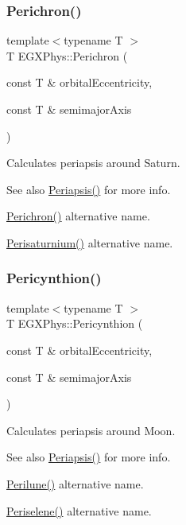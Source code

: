 \subsubsection{\texorpdfstring{Perichron()}{Perichron()}}
{\footnotesize\ttfamily template$<$typename T $>$ \\
T E\+G\+X\+Phys\+::\+Perichron (\begin{DoxyParamCaption}\item[{const T \&}]{orbital\+Eccentricity,  }\item[{const T \&}]{semimajor\+Axis }\end{DoxyParamCaption})}



Calculates periapsis around Saturn. 

\begin{DoxySeeAlso}{See also}
\hyperlink{group___astrophysics_ga4414ac75539371ec874a3d25cad6c9fe}{Periapsis()} for more info. 

\hyperlink{group___astrophysics_ga12b5e99aa2e3e7031ef6ce93060cf516}{Perichron()} alternative name. 

\hyperlink{group___astrophysics_ga60a50d09d29ebe47cbbfc125c2ea42bf}{Perisaturnium()} alternative name. 
\end{DoxySeeAlso}
\mbox{\label{group___astrophysics_gaeeba153b188cd06cbd233eaef12f0a6a}} 
\subsubsection{\texorpdfstring{Pericynthion()}{Pericynthion()}}
{\footnotesize\ttfamily template$<$typename T $>$ \\
T E\+G\+X\+Phys\+::\+Pericynthion (\begin{DoxyParamCaption}\item[{const T \&}]{orbital\+Eccentricity,  }\item[{const T \&}]{semimajor\+Axis }\end{DoxyParamCaption})}



Calculates periapsis around Moon. 

\begin{DoxySeeAlso}{See also}
\hyperlink{group___astrophysics_ga4414ac75539371ec874a3d25cad6c9fe}{Periapsis()} for more info. 

\hyperlink{group___astrophysics_ga2cc7ab05e18d32c94d8d74972e032793}{Perilune()} alternative name. 

\hyperlink{group___astrophysics_ga255874374dde571531e443cdbef9ef0c}{Periselene()} alternative name. 
\end{DoxySeeAlso}
\mbox{\label{group___astrophysics_gaa270e364cbbd7d3d6212872df484926f}} 
